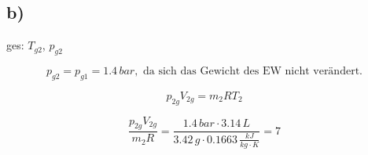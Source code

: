

\subsection*{b)}
ges: $T_{g2}$, $p_{g2}$

\[
p_{g2} = p_{g1} = 1.4 \, bar, \text{ da sich das Gewicht des EW nicht verändert.}
\]

\[
p_{2g} V_{2g} = m_2 R T_2
\]

\[
\frac{p_{2g} V_{2g}}{m_2 R} = \frac{1.4 \, bar \cdot 3.14 \, L}{3.42 \, g \cdot 0.1663 \, \frac{kJ}{kg \cdot K}} = 7
\]